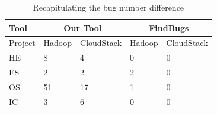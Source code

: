 \documentclass[sigconf]{acmart}
\begin{document}
\begin{table}[ht!]
\begin{tabular}{|l|l|l|l|l|}
\hline
Tool    & \multicolumn{2}{c|}{Our Tool} & \multicolumn{2}{c|}{FindBugs} \\ \hline
Project & Hadoop      & CloudStack      & Hadoop      & CloudStack      \\ \hline
HE      & 8           & 4               & 0           & 0               \\ \hline
ES      & 2           & 2               & 2           & 0               \\ \hline
OS      & 51          & 17              & 1           & 0               \\ \hline
IC      & 3           & 6               & 0           & 0               \\ \hline
\end{tabular}
\caption{Recapitulating the bug number difference}
\label{tablerecap}
\vspace{-10mm}
\end{table}
\end{document}
